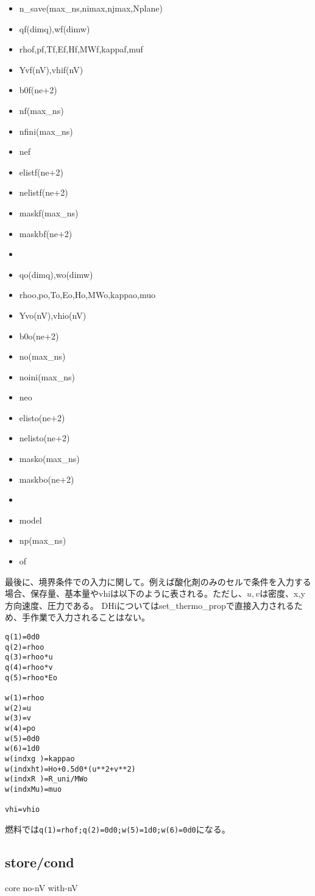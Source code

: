 \documentclass{jsarticle}
\begin{document}
\begin{itemize}
\item n\_save(max\_ns,nimax,njmax,Nplane)
\item qf(dimq),wf(dimw)
\item rhof,pf,Tf,Ef,Hf,MWf,kappaf,muf
\item Yvf(nV),vhif(nV)
\item b0f(ne+2)
\item nf(max\_ns)
\item nfini(max\_ns)
\item nef
\item elistf(ne+2)
\item nelistf(ne+2)
\item maskf(max\_ns)
\item maskbf(ne+2)
\item 
\item qo(dimq),wo(dimw)
\item rhoo,po,To,Eo,Ho,MWo,kappao,muo
\item Yvo(nV),vhio(nV)
\item b0o(ne+2)
\item no(max\_ns)
\item noini(max\_ns)
\item neo
\item elisto(ne+2)
\item nelisto(ne+2)
\item masko(max\_ns)
\item maskbo(ne+2)
\item 
\item model
\item np(max\_ns)
\item of
\end{itemize}

最後に、境界条件での入力に関して。例えば酸化剤のみのセルで条件を入力する場合、保存量、基本量やvhiは以下のように表される。ただし、$u,v$は密度、x,y方向速度、圧力である。
DHiについてはset\_thermo\_propで直接入力されるため、手作業で入力されることはない。
\begin{verbatim}
q(1)=0d0
q(2)=rhoo
q(3)=rhoo*u
q(4)=rhoo*v
q(5)=rhoo*Eo

w(1)=rhoo
w(2)=u
w(3)=v
w(4)=po
w(5)=0d0
w(6)=1d0
w(indxg )=kappao
w(indxht)=Ho+0.5d0*(u**2+v**2)
w(indxR )=R_uni/MWo
w(indxMu)=muo

vhi=vhio
\end{verbatim}
燃料では\verb|q(1)=rhof;q(2)=0d0;w(5)=1d0;w(6)=0d0|になる。

\subsection{store/cond}%
core
no-nV
with-nV
\end{document}
